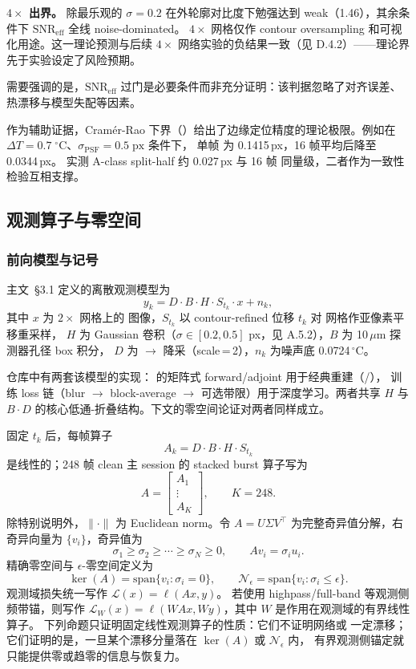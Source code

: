 \textbf{\(4\times\) 出界。} 除最乐观的 \(\sigma = 0.2\) 在外轮廓对比度下勉强达到 weak（1.46），其余条件下 \(\mathrm{SNR}_{\mathrm{eff}}\) 全线 noise-dominated。
\(4\times\) 网格仅作 contour oversampling 和可视化用途。这一理论预测与后续 \(4\times\) 网络实验的负结果一致（见 D.4.2）——理论界先于实验设定了风险预期。

需要强调的是，\(\mathrm{SNR}_{\mathrm{eff}}\) 过门是必要条件而非充分证明：该判据忽略了对齐误差、热漂移与模型失配等因素。

作为辅助证据，Cramér-Rao 下界（）给出了边缘定位精度的理论极限。例如在 \(\Delta T = 0.7\;^\circ\mathrm{C}\)、\(\sigma_{\mathrm{PSF}} = 0.5\;\mathrm{px}\) 条件下，
单帧  为 0.1415\,px，16 帧平均后降至 0.0344\,px。 实测 A-class split-half 约 0.027\,px 与 16 帧  同量级，二者作为一致性检验互相支撑。

\subsection{观测算子与零空间}

\subsubsection{前向模型与记号}

主文~\S3.1 定义的离散观测模型为
\[
  y_k = D \cdot B \cdot H \cdot S_{t_k} \cdot x + n_k,
\]
其中 \(x\) 为 \(2\times\) 网格上的  图像，\(S_{t_k}\) 以 contour-refined 位移 \(t_k\) 对  网格作亚像素平移重采样，
\(H\) 为 Gaussian  卷积（\(\sigma \in [0.2, 0.5]\)  px，见 A.5.2），\(B\) 为 10\,\(\mu\)m 探测器孔径 box 积分，
\(D\) 为 \(\rightarrow\) 降采（scale\,=\,2），\(n_k\) 为噪声底 0.0724\,\(^\circ\)C。

仓库中有两套该模型的实现： 的矩阵式 forward/adjoint 用于经典重建（/），
 训练 loss 链（blur \(\rightarrow\) block-average \(\rightarrow\) 可选带限）用于深度学习。两者共享 \(H\) 与 \(B \cdot D\) 的核心低通-折叠结构。下文的零空间论证对两者同样成立。

固定 \(t_k\) 后，每帧算子
\[
  A_k = D \cdot B \cdot H \cdot S_{t_k}
\]
是线性的；248 帧 clean 主 session 的 stacked burst 算子写为
\[
  A = \begin{bmatrix} A_1 \\ \vdots \\ A_K \end{bmatrix}, \qquad K=248.
\]
除特别说明外，\(\|\cdot\|\) 为 Euclidean norm。令 \(A = U\Sigma V^\top\) 为完整奇异值分解，右奇异向量为 \(\{v_i\}\)，奇异值为
\[
  \sigma_1 \ge \sigma_2 \ge \cdots \ge \sigma_N \ge 0,\qquad A v_i = \sigma_i u_i.
\]
精确零空间与 \(\epsilon\)-零空间定义为
\[
  \ker(A)=\mathrm{span}\{v_i:\sigma_i=0\},\qquad
  \mathcal N_\epsilon=\mathrm{span}\{v_i:\sigma_i\le\epsilon\}.
\]
观测域损失统一写作 \(\mathcal L(x)=\ell(Ax,y)\)。
若使用 highpass/full-band 等观测侧频带锚，则写作 \(\mathcal L_W(x)=\ell(WAx,Wy)\)，其中 \(W\) 是作用在观测域的有界线性算子。
下列命题只证明固定线性观测算子的性质：它们不证明网络或  一定漂移；它们证明的是，一旦某个漂移分量落在 \(\ker(A)\) 或 \(\mathcal N_\epsilon\) 内，
有界观测侧锚定就只能提供零或趋零的信息与恢复力。

